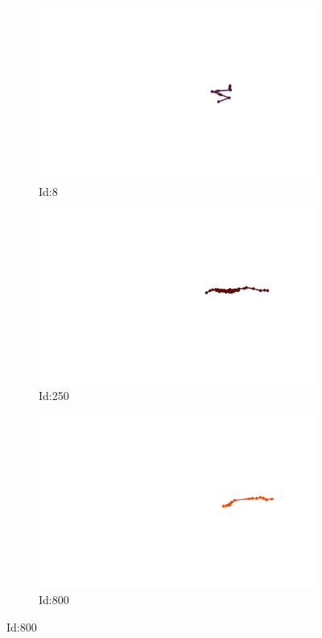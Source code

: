 \documentclass[12pt,twoside]{report}
\begin{document}
\begin{figure}
\centering
\begin{subfigure}[b]{0.20\textwidth}
\centering
\includegraphics[width=\textwidth]{../../trajectories/8.png}
\caption{Id:8}
\end{subfigure}
\begin{subfigure}[b]{0.20\textwidth}
\centering
\includegraphics[width=\textwidth]{../../trajectories/250.png}
\caption{Id:250}
\end{subfigure}
\begin{subfigure}[b]{0.20\textwidth}
\centering
\includegraphics[width=\textwidth]{../../trajectories/800.png}
\caption{Id:800}
\end{subfigure}
\end{figure}
\end{document}

